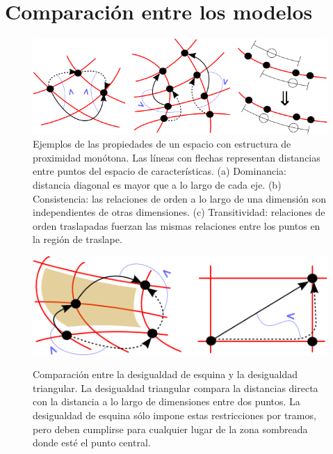 \documentclass[spanish]{article}
\begin{document}
\section{Comparación entre los modelos}


\begin{figure}[t]
  \centering
  \includegraphics[bb=0 0 513 166]{imagenes/dom-cons-trans.png}
  \caption{\small %
    Ejemplos de las propiedades de un espacio con estructura de proximidad
    monótona. Las líneas con flechas representan distancias entre puntos del
    espacio de características.
    (a) Dominancia: distancia diagonal es mayor que a lo largo de cada eje.
    (b) Consistencia: las relaciones de orden a lo largo de una dimensión son
        independientes de otras dimensiones.
    (c) Transitividad: relaciones de orden traslapadas fuerzan las mismas
        relaciones entre los puntos en la región de traslape.
  }
  \label{fig:cons-dom-trans}
\end{figure}

\begin{figure}[t]
  \centering
  \includegraphics[bb=0 0 374 125]{imagenes/esquina.png}
  \label{fig:esquina}
  \caption{\small %
    Comparación entre la desigualdad de esquina y la desigualdad
    triangular.  La desigualdad triangular compara la distancias directa con
    la distancia a lo largo de dimensiones entre dos puntos.  La desigualdad de
    esquina sólo impone estas restricciones por tramos, pero deben cumplirse
    para cualquier lugar de la zona sombreada donde esté el punto central.
  }
\end{figure}
\end{document}
